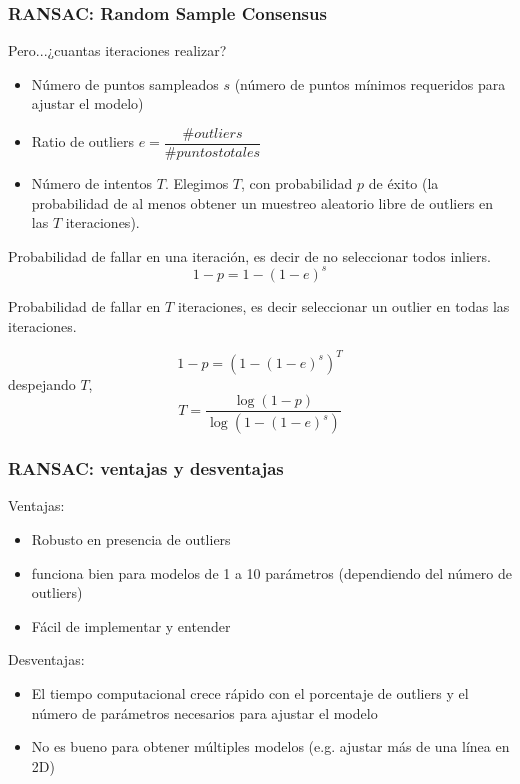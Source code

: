 \begin{frame}
    \frametitle{RANSAC: Random Sample Consensus}
    \footnotesize
    
    Pero...¿cuantas iteraciones realizar?
    
    \begin{itemize}
        \item Número de puntos sampleados $s$ (número de puntos mínimos requeridos para ajustar el modelo)
        \item Ratio de outliers $e = \dfrac{\# outliers}{\# puntos totales}$
        \item Número de intentos $T$.
        Elegimos $T$, con probabilidad $p$ de éxito (la probabilidad de al menos obtener un muestreo aleatorio libre de outliers en las $T$ iteraciones).
    \end{itemize}
    
    Probabilidad de fallar en una iteración, es decir de no seleccionar todos inliers.
    \begin{equation*}
        1-p = 1 - (1 - e)^{s}
    \end{equation*} 
    
    
    Probabilidad de fallar en $T$ iteraciones, es decir seleccionar un outlier en todas las iteraciones.
    
    \begin{equation*}
        1-p = (1 - (1 - e)^{s})^{T}
    \end{equation*} 
    despejando $T$,
    \begin{equation*}
        T = \dfrac{\log(1-p)}{\log(1-(1-e)^{s})}
    \end{equation*} 
    
\end{frame}

\begin{frame}
    \frametitle{RANSAC: ventajas y desventajas}
    \footnotesize
    Ventajas:
    \begin{itemize}
        \item Robusto en presencia de outliers
        \item funciona bien para modelos de 1 a 10 parámetros (dependiendo del número de outliers)
        \item Fácil de implementar y entender
    \end{itemize}
    Desventajas:
    \begin{itemize}
        \item El tiempo computacional crece rápido con el porcentaje de outliers y el número de parámetros necesarios para ajustar el modelo
        \item No es bueno para obtener múltiples modelos (e.g. ajustar más de una línea en 2D)
    \end{itemize}
\end{frame}

